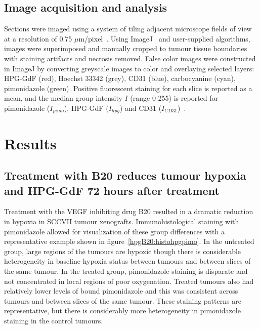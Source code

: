 \subsection{Image acquisition and analysis}
Sections were imaged using a system of tiling adjacent microscope fields of view at a resolution of 0.75 $\mu$m/pixel~\cite{Kyle:2007ch}.
Using ImageJ~\cite{Collins:2007jr} and user-supplied algorithms, images were superimposed and manually cropped to tumour tissue boundaries with staining artifacts and necrosis removed.
False color images were constructed in ImageJ by converting greyscale images to color and overlaying selected layers: \acs{HPG-GdF} (red), Hoechst 33342 (grey), CD31 (blue), carbocyanine (cyan), pimonidazole (green).
Positive fluorescent staining for each slice is reported as a mean, and the median group intensity $I$ (range 0-255) is reported for pimonidazole ($I_{pimo}$), \acs{HPG-GdF} ($I_{hpg}$) and CD31 ($I_{CD31}$)~.

\section{Results}

\subsection{Treatment with B20 reduces tumour hypoxia and \acs{HPG-GdF} 72 hours after treatment}

Treatment with the \acs{VEGF} inhibiting drug B20 resulted in a dramatic reduction in hypoxia in SCCVII tumour xenografts.
Immunohistological staining with pimonidazole allowed for visualization of these group differences with a representative example shown in figure~\ref{hpgB20:histohpgpimo}.
In the untreated group, large regions of the tumours are hypoxic though there is considerable heterogeneity in baseline hypoxia status between tumours and between slices of the same tumour.
In the treated group, pimonidazole staining is disparate and not concentrated in local regions of poor oxygenation.
Treated tumours also had relatively lower levels of bound pimonidazole and this was consistent across tumours and between slices of the same tumour.
These staining patterns are representative, but there is considerably more heterogeneity in pimonidazole staining in the control tumours.

